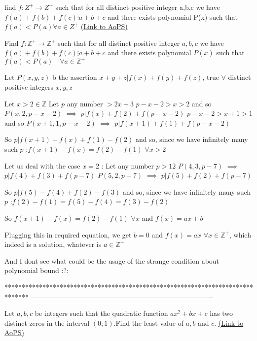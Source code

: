 \begin{problem}
	find $f:Z^{+} \to Z^{+}$ such that for all distinct positive integer a,b,c we have $f(a)+f(b)+f(c) \vdots a+b+c$ and there exists polynomial P(x) such that $f(a)<P(a) \forall a \in Z^{+}$
	\flushright \href{https://artofproblemsolving.com/community/c6h564055}{(Link to AoPS)}
\end{problem}



\begin{solution}
	\begin{tcolorbox}Find $f:\mathbb{Z}^{+} \to \mathbb{Z}^{+}$ such that for all distinct positive integer $a,b,c$ we have $f(a)+f(b)+f(c) \vdots a+b+c$ and there exists polynomial $P(x)$ such that $f(a)<P(a) \quad  \forall a \in \mathbb{Z}^{+}$\end{tcolorbox}
Let $P(x,y,z)$ b the assertion $x+y+z|f(x)+f(y)+f(z)$, true $\forall$ distinct positive integers $x,y,z$

Let $x> 2\in\mathbb Z$
Let $p$ any number $>2x+3$
$p-x-2>x>2$ and so $P(x,2,p-x-2)$ $\implies$ $p|f(x)+f(2)+f(p-x-2)$
$p-x-2>x+1>1$ and so $P(x+1,1,p-x-2)$ $\implies$ $p|f(x+1)+f(1)+f(p-x-2)$

So $p|f(x+1)-f(x)+f(1)-f(2)$ and so, since we have infinitely many such $p$ :$f(x+1)-f(x)=f(2)-f(1)$ $\forall x>2$

Let us deal with the case $x=2$ :
Let any number $p>12$ 
$P(4,3,p-7)$ $\implies$ $p|f(4)+f(3)+f(p-7)$
$P(5,2,p-7)$ $\implies$ $p|f(5)+f(2)+f(p-7)$

So $p|f(5)-f(4)+f(2)-f(3)$ and so, since we have infinitely many such $p$ :$f(2)-f(1)=f(5)-f(4)=f(3)-f(2)$ 

So $f(x+1)-f(x)=f(2)-f(1)$ $\forall x$ and $f(x)=ax+b$

Plugging this in required equation, we get $b=0$ and $\boxed{f(x)=ax}$ $\forall x\in\mathbb Z^+$, which indeed is a solution, whatever is $a\in\mathbb Z^+$

And I dont see what could be the usage of the strange condition about polynomial bound :?:
\end{solution}
*******************************************************************************
-------------------------------------------------------------------------------

\begin{problem}
	Let $a,b,c$ be integers such that the quadratic function $ax^2+bx+c$ has two distinct zeros in the interval $(0;1)$.Find the least value of $a,b$ and $c$.
	\flushright \href{https://artofproblemsolving.com/community/c6h564781}{(Link to AoPS)}
\end{problem}




